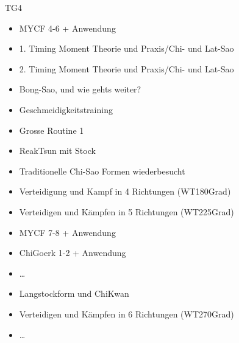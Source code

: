 \begin{WTGradTG}{4}{TG4}

\begin{itemize}
	\item MYCF 4-6 + Anwendung
	\item 1. Timing Moment Theorie und Praxis/Chi- und Lat-Sao
	\item 2. Timing Moment Theorie und Praxis/Chi- und Lat-Sao
	\item Bong-Sao, und wie gehts weiter?
	\item Geschmeidigkeitstraining
	\item Grosse Routine 1
	\item ReakTsun mit Stock
	\item Traditionelle Chi-Sao Formen wiederbesucht
	\item Verteidigung und Kampf in 4 Richtungen (WT180Grad)
\end{itemize}
	
\end{WTGradTG}

\begin{WTGradTG}{5}{}

\begin{itemize}
	\item Verteidigen und K\"ampfen in 5 Richtungen (WT225Grad)
	\item MYCF 7-8 + Anwendung
	\item ChiGoerk 1-2 + Anwendung
	\item \ldots
\end{itemize}

\end{WTGradTG}

\begin{WTGradTG}{6}{}

\begin{itemize}
	\item Langstockform und ChiKwan
	\item Verteidigen und K\"ampfen in 6 Richtungen (WT270Grad)
	\item \ldots
\end{itemize}

\end{WTGradTG}

